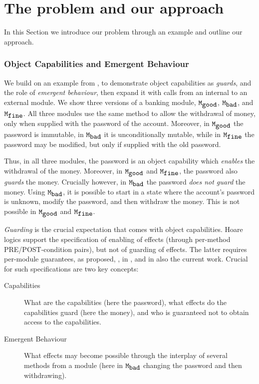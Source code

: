 

\section{The problem and our approach}
\label{s:outline}
  
In this Section we introduce our problem  through an example and outline our approach.

   \subsubsection{Object Capabilities and Emergent Behaviour} %
\label{s:bank}
We {build}  on an example from \cite{XXXELang,FASE},  
to demonstrate  object capabilities as \emph{guards}, and the role of
  \emph{emergent behaviour}, 
 then expand it %
{with} calls from an internal to an external module.
%
We show three versions of a banking module, $\mbox{\normalfont{\texttt{M}}}_{\mbox{\normalfont{\texttt{good}}}}$, $\mbox{\normalfont{\texttt{M}}}_{\mbox{\normalfont{\texttt{bad}}}}$, and $\mbox{\normalfont{\texttt{M}}}_{\mbox{\normalfont{\texttt{fine}}}}$. 
All three modules  {use the same method to} allow the withdrawal of money, only when supplied with the password of the account.
Moreover, in $\mbox{\normalfont{\texttt{M}}}_{\mbox{\normalfont{\texttt{good}}}}$ the password is immutable, in $\mbox{\normalfont{\texttt{M}}}_{\mbox{\normalfont{\texttt{bad}}}}$ it is unconditionally mutable, while in $\mbox{\normalfont{\texttt{M}}}_{\mbox{\normalfont{\texttt{fine}}}}$ the password may be modified, but only if supplied with the old password. 


{Thus, in all three modules, the password is an object capability which \emph{enables} the withdrawal of the money. 
Moreover, in $\mbox{\normalfont{\texttt{M}}}_{\mbox{\normalfont{\texttt{good}}}}$ and $\mbox{\normalfont{\texttt{M}}}_{\mbox{\normalfont{\texttt{fine}}}}$, the password also \emph{guards} the money.
Crucially however,  in $\mbox{\normalfont{\texttt{M}}}_{\mbox{\normalfont{\texttt{bad}}}}$ the password \emph{does not guard} the money. 
Using $\mbox{\normalfont{\texttt{M}}}_{\mbox{\normalfont{\texttt{bad}}}}$, it is possible to start in a state where the account's password is unknown, modify the password, and then withdraw the money. 
 This is not possible  in $\mbox{\normalfont{\texttt{M}}}_{\mbox{\normalfont{\texttt{good}}}}$ and $\mbox{\normalfont{\texttt{M}}}_{\mbox{\normalfont{\texttt{fine}}}}$.
}

\emph{Guarding} is the crucial expectation that comes with object capabilities.
Hoare logics support the specification of    enabling of effects (through per-method PRE/POST-condition pairs), but not of guarding of effects.
The latter %
requires per-module guarantees, as proposed, \eg,  in \cite{OOPSLA22}, and in also the current work.
%
\noindent
Crucial for such specifications are  two key concepts:
\begin{description}
\item[Capabilities] What are the capabilities (here the password), what effects do the capabilities {guard} (here the money), 
and who is guaranteed not to obtain access to the capabilities.
\item[Emergent Behaviour] What effects may become possible through the interplay of several methods from a module  (here in ${\mbox{\normalfont{\texttt{M}}}_{\mbox{\normalfont{\texttt{bad}}}}}$  
{changing the password and then withdrawing}).
\end{description} 

